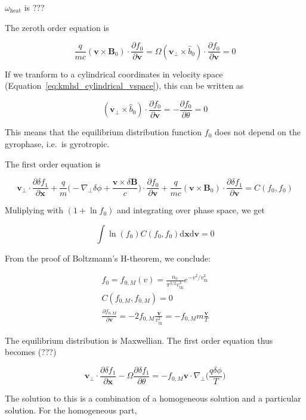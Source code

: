 \documentclass[
  notoc %
]{tufte-book}
\begin{document}
\(\omega_{\text{heat}}\) is ???

The zeroth order equation is

\[
\frac{q}{mc}(\mathbf{v}\times\mathbf{B}_0)\cdot\frac{\partial f_0}{\partial\mathbf{v}} = \Omega(\mathbf{v}_\perp\times\hat{b}_0)\cdot\frac{\partial f_0}{\partial\mathbf{v}} = 0
\]

If we tranform to a cylindrical coordinates in velocity space
(Equation~\ref{eq:kmhd_cylindrical_vspace}), this can be written as

\[
(\mathbf{v}_\perp\times\hat{b}_0)\cdot\frac{\partial f_0}{\partial\mathbf{v}} = -\frac{\partial f_0}{\partial\theta} = 0
\]

This means that the equilibrium distribution function \(f_0\) does not
depend on the gyrophase, i.e.~is gyrotropic.

The first order equation is

\[
\mathbf{v}_\perp\cdot\frac{\partial \delta f_1}{\partial\mathbf{x}} + \frac{q}{m}\Big( -\nabla_\perp\delta\phi+\frac{\mathbf{v}\times\delta\mathbf{B}}{c} \Big)\cdot\frac{\partial f_0}{\partial\mathbf{v}} + \frac{q}{mc}(\mathbf{v}\times\mathbf{B}_0)\cdot\frac{\partial \delta f_1}{\partial\mathbf{v}} = C(f_0, f_0)
\]

Muliplying with \((1+\ln f_0)\) and integrating over phase space, we get

\[
\int \ln(f_0)C(f_0, f_0)\mathrm{d}\mathbf{x}\mathrm{d}\mathbf{v} = 0
\]

From the proof of Boltzmann's H-theorem, we conclude:

\[
\begin{aligned}
f_0 = f_{0,M}(v) = \frac{n_0}{\pi^{3/2}v_{\text{th}}^3}e^{-v^2/v_{\text{th}}^2} \\
C(f_{0,M}, f_{0,M}) = 0 \\
\frac{\partial f_{0,M}}{\partial\mathbf{v}} = -2f_{0,M}\frac{\mathbf{v}}{v_\text{th}^2} = -f_{0,M}m\frac{\mathbf{v}}{T}
\end{aligned}
\]

The equilibrium distribution is Maxwellian. The first order equation
thus becomes (???)

\[
\mathbf{v}_\perp\cdot\frac{\partial \delta f_1}{\partial\mathbf{x}} - \Omega\frac{\partial\delta f_1}{\partial\theta} = -f_{0,M}\mathbf{v}\cdot\nabla_\perp\Big(\frac{q\delta\phi}{T}\Big)
\]

The solution to this is a combination of a homogeneous solution and a
particular solution. For the homogeneous part,
\end{document}
